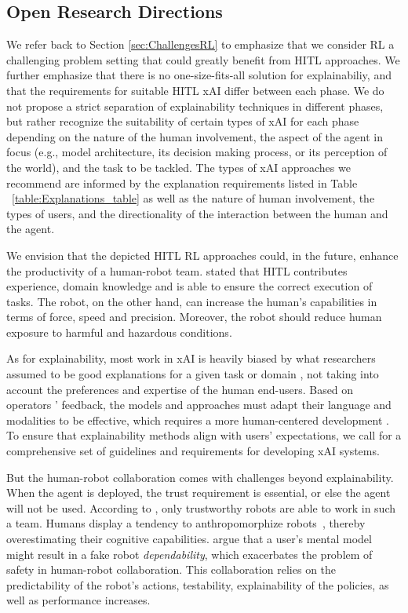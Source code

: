 \documentclass[twoside,11pt]{article}
\begin{document}
\subsection{Open Research Directions}

We refer back to Section \ref{sec:ChallengesRL} to emphasize that we consider RL a challenging problem setting that could greatly benefit from HITL approaches. We further emphasize that there is no one-size-fits-all solution for explainabiliy, and that the requirements for suitable HITL xAI differ between each phase. We do not propose a strict separation of explainability techniques in different phases, but rather recognize the suitability of certain types of xAI for each phase depending on the nature of the human involvement, the aspect of the agent in focus (e.g., model architecture, its decision making process, or its perception of the world), and the task to be tackled. The types of xAI approaches we recommend are informed by the explanation requirements listed in Table ~\ref{table:Explanations_table} as well as the nature of human involvement, the types of users, and the directionality of the interaction between the human and the agent.

We envision that the depicted HITL RL approaches could, in the future, enhance the productivity of a human-robot team. \citet{KhatibEtAl:1999:RihEnvironment} stated that HITL contributes experience, domain knowledge and is able to ensure the correct execution of tasks. The robot, on the other hand, can increase the human's capabilities in terms of force, speed and precision. Moreover, the robot should reduce human exposure to harmful and hazardous conditions. 

As for explainability, most work in xAI is heavily biased by what researchers assumed to be good explanations for a given task or domain \citep{Miller:2019:xAISocialSciencesInsights}, not taking into account the preferences and expertise of the human end-users. Based on operators ' feedback, the models and approaches must adapt their language and modalities to be effective, which requires a more human-centered development \citep{PuiuttaVeith:2020:xAIRLSurvey}. To ensure that explainability methods align with users' expectations, we call for a comprehensive set of guidelines and requirements for developing xAI systems. 

But the human-robot collaboration comes with challenges beyond explainability. When the agent is deployed, the trust requirement is essential, or else the agent will not be used. According to \citet{DeSaintsEtAl:2008:phri}, only trustworthy robots are able to work in such a team. Humans display a tendency to anthropomorphize robots~\citep{damiano2018anthropomorphism}, thereby overestimating their cognitive capabilities. \citet{DeSaintsEtAl:2008:phri} argue that a user's mental model might result in a fake robot \emph{dependability}, which exacerbates the problem of safety in human-robot collaboration. This collaboration relies on the predictability of the robot's actions, testability, explainability of the policies, as well as performance increases.
\end{document}
